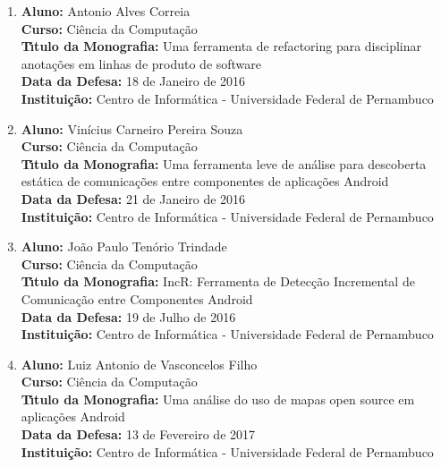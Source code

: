 \documentclass[a4paper,oneside,10pt]{article}
\begin{document}
\begin{enumerate}
\renewcommand{\labelenumi}{{\large\bfseries\arabic{enumi}.}}

\item       \textbf{Aluno:} Antonio Alves Correia \mbox{}\\
            \textbf{Curso:} Ciência da Computação\\
            \textbf{T\'{\i}tulo da Monografia:} Uma ferramenta de refactoring para disciplinar anotações em linhas de produto de software\\
            \textbf{Data da Defesa:} 18 de Janeiro de 2016\\
            \textbf{Institui\c{c}\~{a}o:} Centro de Informática - Universidade Federal de Pernambuco

\item       \textbf{Aluno:} Vinícius Carneiro Pereira Souza \mbox{}\\
            \textbf{Curso:} Ciência da Computação\\
            \textbf{T\'{\i}tulo da Monografia:} Uma ferramenta leve de análise para descoberta estática de comunicações entre componentes de aplicações Android\\
            \textbf{Data da Defesa:} 21 de Janeiro de 2016\\
            \textbf{Institui\c{c}\~{a}o:} Centro de Informática - Universidade Federal de Pernambuco

\item       \textbf{Aluno:} João Paulo Tenório Trindade \mbox{}\\
            \textbf{Curso:} Ciência da Computação\\
            \textbf{T\'{\i}tulo da Monografia:} IncR: Ferramenta de Detecção Incremental de Comunicação entre Componentes Android\\
            \textbf{Data da Defesa:} 19 de Julho de 2016\\
            \textbf{Institui\c{c}\~{a}o:} Centro de Informática - Universidade Federal de Pernambuco

\item       \textbf{Aluno:} Luiz Antonio de Vasconcelos Filho \mbox{}\\
            \textbf{Curso:} Ciência da Computação\\
            \textbf{T\'{\i}tulo da Monografia:} Uma análise do uso de mapas open source em aplicações Android\\
            \textbf{Data da Defesa:} 13 de Fevereiro de 2017\\
            \textbf{Institui\c{c}\~{a}o:} Centro de Informática - Universidade Federal de Pernambuco

\end{enumerate}
\end{document}
